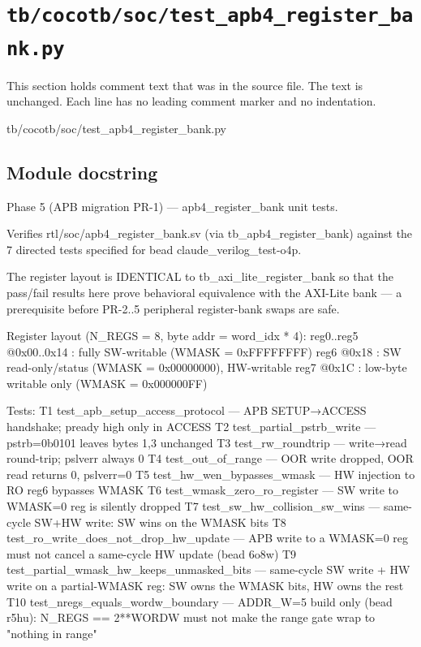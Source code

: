 \section{\texttt{tb/cocotb/soc/test\_apb4\_register\_bank.py}}\label{tm:suite:soc-test-apb4-register-bank}

This section holds comment text that was in the source file. The text is unchanged. Each line has no leading comment marker and no indentation.

\begin{relocated}{tb/cocotb/soc/test_apb4_register_bank.py}

\subsection*{Module docstring}

\begin{textblock}
Phase 5 (APB migration PR-1) — apb4_register_bank unit tests.

Verifies rtl/soc/apb4_register_bank.sv (via tb_apb4_register_bank) against the
7 directed tests specified for bead claude_verilog_test-o4p.

The register layout is IDENTICAL to tb_axi_lite_register_bank so that the
pass/fail results here prove behavioral equivalence with the AXI-Lite bank —
a prerequisite before PR-2..5 peripheral register-bank swaps are safe.

Register layout (N_REGS = 8, byte addr = word_idx * 4):
reg0..reg5  @0x00..0x14 : fully SW-writable (WMASK = 0xFFFFFFFF)
reg6        @0x18       : SW read-only/status (WMASK = 0x00000000), HW-writable
reg7        @0x1C       : low-byte writable only (WMASK = 0x000000FF)

Tests:
T1  test_apb_setup_access_protocol  — APB SETUP→ACCESS handshake; pready high only in ACCESS
T2  test_partial_pstrb_write        — pstrb=0b0101 leaves bytes 1,3 unchanged
T3  test_rw_roundtrip               — write→read round-trip; pslverr always 0
T4  test_out_of_range               — OOR write dropped, OOR read returns 0, pslverr=0
T5  test_hw_wen_bypasses_wmask      — HW injection to RO reg6 bypasses WMASK
T6  test_wmask_zero_ro_register     — SW write to WMASK=0 reg is silently dropped
T7  test_sw_hw_collision_sw_wins    — same-cycle SW+HW write: SW wins on the WMASK bits
T8  test_ro_write_does_not_drop_hw_update
— APB write to a WMASK=0 reg must not cancel a
same-cycle HW update (bead 6o8w)
T9  test_partial_wmask_hw_keeps_unmasked_bits
— same-cycle SW write + HW write on a partial-WMASK
reg: SW owns the WMASK bits, HW owns the rest
T10 test_nregs_equals_wordw_boundary
— ADDR_W=5 build only (bead r5hu): N_REGS == 2**WORDW
must not make the range gate wrap to "nothing in range"


\end{textblock}
\end{relocated}
